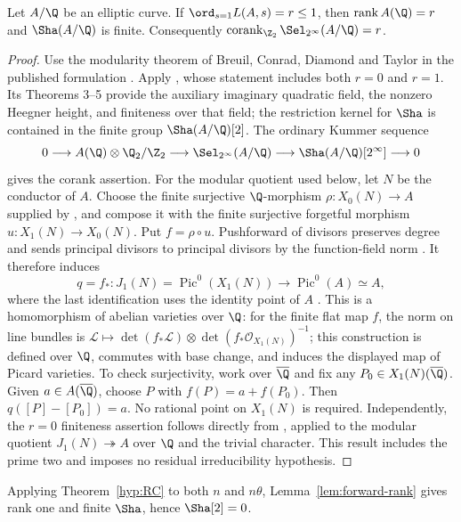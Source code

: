 
\begin{lemma}\label{lem:forward-rank}
Let $A/\Q$ be an elliptic curve. If $\ord_{s=1}L(A,s)=r\leq1$,
then $\operatorname{rank}A(\Q)=r$ and $\Sha(A/\Q)$ is finite.
Consequently $\operatorname{corank}_{\Z_2}\Sel_{2^\infty}(A/\Q)=r$.
\end{lemma}
\begin{proof}
Use the modularity theorem of Breuil, Conrad, Diamond and Taylor
\cite{bcdt} in the published formulation
\cite[Theorem C.13.6, p.~442]{silverman}.
Apply \cite[Theorem 1, pp.~430--431]{kolyvagin}, whose statement
includes both $r=0$ and $r=1$. Its Theorems 3--5 provide the
auxiliary imaginary quadratic field, the nonzero Heegner height,
and finiteness over that field; the restriction kernel for $\Sha$
is contained in the finite group $\Sha(A/\Q)[2]$.
The ordinary Kummer sequence
\[
0\longrightarrow A(\Q)\otimes\Q_2/\Z_2
\longrightarrow\Sel_{2^\infty}(A/\Q)
\longrightarrow\Sha(A/\Q)[2^\infty]\longrightarrow0
\]
gives the corank assertion.
For the modular quotient used below, let $N$ be the conductor of $A$.
Choose the finite surjective $\Q$-morphism
$\rho:X_0(N)\to A$ supplied by
\cite[Theorem C.13.6]{silverman}, and compose it with the finite
surjective forgetful morphism $u:X_1(N)\to X_0(N)$.
Put $f=\rho\circ u$. Pushforward of divisors preserves degree
and sends principal divisors to principal divisors by the function-field
norm \cite[Proposition II.3.6(c),(d)]{silverman}.
It therefore induces
\[
 q=f_*:J_1(N)=\operatorname{Pic}^0(X_1(N))
       \longrightarrow\operatorname{Pic}^0(A)\simeq A,
\]
where the last identification uses the identity point of $A$
\cite[Proposition III.3.4]{silverman}.
This is a homomorphism of abelian varieties over $\Q$: for the finite
flat map $f$, the norm on line bundles is
$\mathcal L\mapsto\det(f_*\mathcal L)\otimes
\det(f_*\mathcal O_{X_1(N)})^{-1}$;
this construction is defined over $\Q$, commutes with base change,
and induces the displayed map of Picard varieties.
To check surjectivity, work over $\overline{\Q}$ and fix any
$P_0\in X_1(N)(\overline{\Q})$. Given $a\in A(\overline{\Q})$,
choose $P$ with $f(P)=a+f(P_0)$. Then
$q([P]-[P_0])=a$. No rational point on $X_1(N)$ is required.
Independently, the $r=0$ finiteness
assertion follows directly from \cite[Corollary 14.3]{kato},
applied to the modular quotient $J_1(N)\twoheadrightarrow A$
over $\Q$ and the trivial character. This result includes the
prime two and imposes no residual irreducibility hypothesis.
\end{proof}

Applying Theorem~\ref{hyp:RC} to both $n$ and $n\theta$,
Lemma~\ref{lem:forward-rank} gives rank one and finite $\Sha$, hence
$\Sha[2]=0$.
